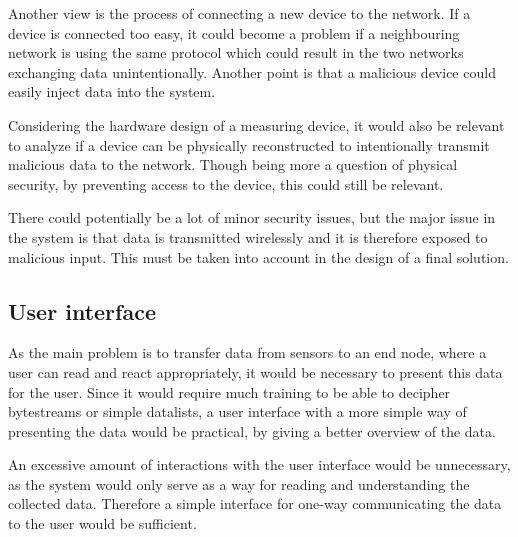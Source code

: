 Another view is the process of connecting a new device to the network. If a device is connected too easy, it could become a problem if a neighbouring network is using the same protocol which could result in the two networks exchanging data unintentionally. Another point is that a malicious device could easily inject data into the system.

Considering the hardware design of a measuring device, it would also be relevant to analyze if a device can be physically reconstructed to intentionally transmit malicious data to the network. Though being more a question of physical security, by preventing access to the device, this could still be relevant.

There could potentially be a lot of minor security issues, but the major issue in the system is that data is transmitted wirelessly and it is therefore exposed to malicious input. This must be taken into account in the design of a final solution.

\subsection{User interface}
As the main problem is to transfer data from sensors to an end node, where a user can read and react appropriately, it would be necessary to present this data for the user. Since it would require much training to be able to decipher bytestreams or simple datalists, a user interface with a more simple way of presenting the data would be practical, by giving a better overview of the data.

An excessive amount of interactions with the user interface would be unnecessary, as the system would only serve as a way for reading and understanding the collected data. Therefore a simple interface for one-way communicating the data to the user would be sufficient.

